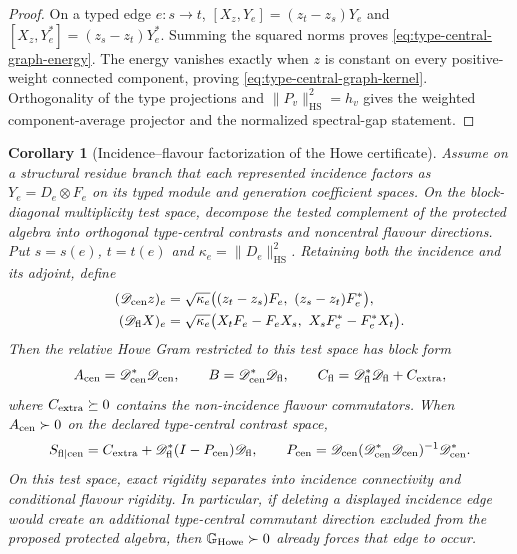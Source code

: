 \documentclass[11pt]{article}
\numberwithin{equation}{section}
\newtheorem{corollary}[theorem]{Corollary}
\theoremstyle{definition}
\theoremstyle{remark}
\newcommand{\HS}{\mathrm{HS}}
\newcommand{\norm}[1]{\lVert#1\rVert}
\begin{document}
\begin{proof}
On a typed edge $e:s\to t$,
$[X_z,Y_e]=(z_t-z_s)Y_e$ and
$[X_z,Y_e^*]=(z_s-z_t)Y_e^*$.  Summing the squared norms proves
\eqref{eq:type-central-graph-energy}.  The energy vanishes exactly when $z$ is
constant on every positive-weight connected component, proving
\eqref{eq:type-central-graph-kernel}.  Orthogonality of the type projections
and $\norm{P_v}_{\HS}^2=h_v$ gives the weighted component-average projector and
the normalized spectral-gap statement.
\end{proof}

\begin{corollary}[Incidence--flavour factorization of the Howe certificate]
\label{cor:howe-incidence-flavour-factorization}
Assume on a structural residue branch that each represented incidence factors
as $Y_e=D_e\otimes F_e$ on its typed module and generation coefficient spaces.
On the block-diagonal multiplicity test space, decompose the tested
complement of the protected algebra into orthogonal type-central contrasts
and noncentral flavour directions.  Put $s=s(e)$, $t=t(e)$ and
$\kappa_e=\norm{D_e}_{\HS}^2$.  Retaining both the incidence and its adjoint,
define
\begin{align*}
 (\mathscr D_{\rm cen}z)_e
 &=\sqrt{\kappa_e}\bigl((z_t-z_s)F_e,\ (z_s-z_t)F_e^*\bigr),\\
 (\mathscr D_{\rm fl}X)_e
 &=\sqrt{\kappa_e}\bigl(X_tF_e-F_eX_s,\ X_sF_e^*-F_e^*X_t\bigr).
\end{align*}
Then the relative Howe Gram restricted to this test space has block form
\[
 A_{\rm cen}=\mathscr D_{\rm cen}^*\mathscr D_{\rm cen},
 \qquad
 B=\mathscr D_{\rm cen}^*\mathscr D_{\rm fl},
 \qquad
 C_{\rm fl}=\mathscr D_{\rm fl}^*\mathscr D_{\rm fl}+C_{\rm extra},
\]
where $C_{\rm extra}\succeq0$ contains the non-incidence flavour
commutators.  When $A_{\rm cen}\succ0$ on the declared type-central contrast
space,
\begin{equation}
 S_{\rm fl\mid cen}
 =C_{\rm extra}
 +\mathscr D_{\rm fl}^*(I-P_{\rm cen})\mathscr D_{\rm fl},
 \qquad
 P_{\rm cen}=\mathscr D_{\rm cen}
 (\mathscr D_{\rm cen}^*\mathscr D_{\rm cen})^{-1}
 \mathscr D_{\rm cen}^*.
 \label{eq:howe-factorized-Schur}
\end{equation}
On this test space, exact rigidity separates into incidence connectivity and
conditional flavour rigidity.  In particular, if deleting a displayed incidence edge would
create an additional type-central commutant direction excluded from the
proposed protected algebra, then
$\mathbb G_{\rm Howe}\succ0$ already forces that edge to occur.
\end{corollary}
\end{document}
